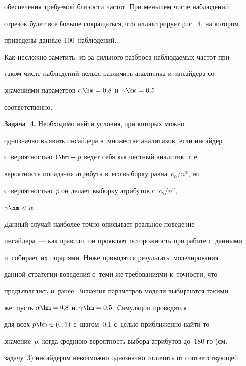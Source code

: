 обеспечения требуемой бли\-зости частот. При меньшем числе наблюдений 


отрезок будет все больше сокращаться, что иллюстрирует рис.~4, на котором 


приведены данные~100~наблюдений.





  Как несложно заметить, из-за сильного разброса наблюдаемых частот при 


таком числе наблюдений нельзя различить аналитика и~инсайдера со 


значениями параметров $\alpha\hm= 0{,}8$ и~$\gamma\hm= 0{,}5$ 


соответственно.


  


  \smallskip


  


  \noindent


  \textbf{Задача~4.} Необходимо найти условия, при которых можно 


однозначно выявить инсайдера в~множестве аналитиков, если инсайдер 


с~вероятностью $1\hm-p$ ведет себя как честный аналитик, т.\,е.\ 


вероятность попадания атрибута в~его выборку равна~$c_\alpha/n^\alpha$, но 


с~вероятностью~$p$ он делает выборку атрибутов с~$c_\gamma/n^\gamma$, 


$\gamma\hm<\alpha$. 


  Данный случай наиболее точно описывает реальное поведение 


инсайдера~--- как правило, он проявляет осторожность при работе с~данными 


и~собирает их порциями. Ниже приводятся результаты моделирования 


данной стратегии поведения с~теми же требованиями к~точности, что 


предъявлялись и~ранее. Значения параметров модели выбираются такими 


же: пусть $\alpha\hm=0{,}8$ и~$\gamma\hm=0{,}5$. Симуляции проводятся 


для всех $p\hm\in (0;1)$ с~шагом~0,1 с~целью приближенно найти то 


значение~$p$, когда среднюю вероятность выбора атрибутов до~180-го (см.\ 


задачу~3) инсайдером невозможно однозначно отличить от соответствующей 


